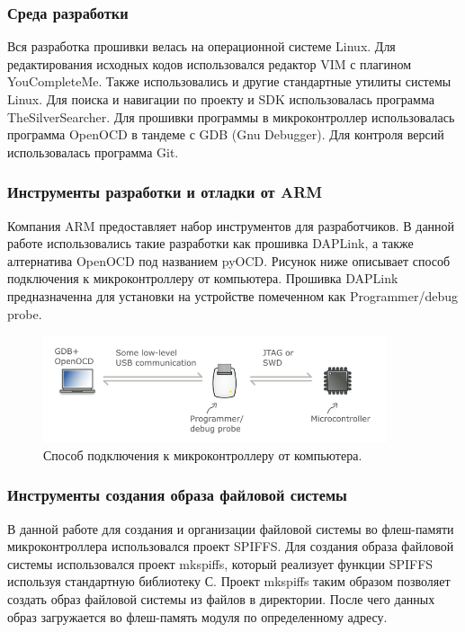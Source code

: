 \subsubsection{Среда разработки}
Вся разработка прошивки велась на операционной системе Linux. Для редактирования исходных кодов использовался редактор VIM с плагином YouCompleteMe. Также использовались и другие стандартные утилиты системы Linux. Для поиска и навигации по проекту и SDK использовалась программа TheSilverSearcher. Для прошивки программы в микроконтроллер использовалась программа OpenOCD в тандеме с GDB (Gnu Debugger). Для контроля версий использовалась программа Git.


\subsubsection{Инструменты разработки и отладки от ARM}
Компания ARM предоставляет набор инструментов для разработчиков. В данной работе использовались такие разработки как прошивка DAPLink, а также алтернатива OpenOCD под названием pyOCD.
Рисунок ниже описывает способ подключения к микроконтроллеру от компьютера. Прошивка DAPLink предназначенна для установки на устройстве помеченном как Programmer/debug probe.

\begin{figure}[h!]
    \centering
    \includegraphics[width=0.9\textwidth]{pc_to_mcu.png}
    \caption{Способ подключения к микроконтроллеру от компьютера.}
\end{figure}


\subsubsection{Инструменты создания образа файловой системы}
В данной работе для создания и организации файловой системы во флеш-памяти микроконтроллера использовался проект SPIFFS.  Для создания образа файловой системы использовался проект mkspiffs, который реализует функции SPIFFS используя стандартную библиотеку С. Проект mkspiffs таким образом позволяет создать образ файловой системы из файлов в директории. После чего данных образ загружается во флеш-память модуля по определенному адресу.


